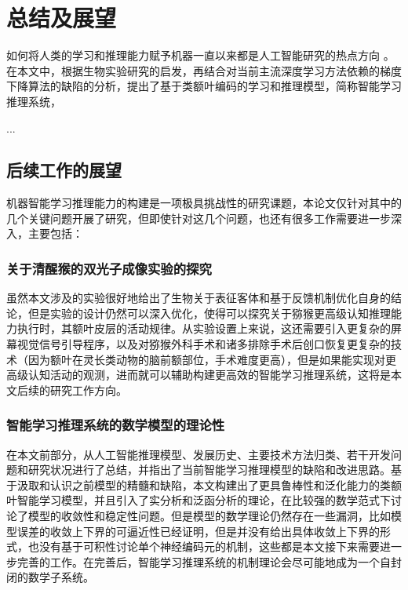 

\chapter{总结及展望}
\label{cha:intro}

如何将人类的学习和推理能力赋予机器一直以来都是人工智能研究的热点方向   。在本文中，根据生物实验研究的启发，再结合对当前主流深度学习方法依赖的梯度下降算法的缺陷的分析，提出了基于类额叶编码的学习和推理模型，简称智能学习推理系统，


...

\section{后续工作的展望}
机器智能学习推理能力的构建是一项极具挑战性的研究课题，本论文仅针对其中的几个关键问题开展了研究，但即使针对这几个问题，也还有很多工作需要进一步深入，主要包括： 

\subsection{关于清醒猴的双光子成像实验的探究}
虽然本文涉及的实验很好地给出了生物关于表征客体和基于反馈机制优化自身的结论，但是实验的设计仍然可以深入优化，使得可以探究关于猕猴更高级认知推理能力执行时，其额叶皮层的活动规律。从实验设置上来说，这还需要引入更复杂的屏幕视觉信号引导程序，以及对猕猴外科手术和诸多排除手术后创口恢复更复杂的技术（因为额叶在灵长类动物的脑前额部位，手术难度更高），但是如果能实现对更高级认知活动的观测，进而就可以辅助构建更高效的智能学习推理系统，这将是本文后续的研究工作方向。

\subsection{智能学习推理系统的数学模型的理论性}
在本文前部分，从人工智能推理模型、发展历史、主要技术方法归类、若干开发问题和研究状况进行了总结，并指出了当前智能学习推理模型的缺陷和改进思路。基于汲取和认识之前模型的精髓和缺陷，本文构建出了更具鲁棒性和泛化能力的类额叶智能学习模型，并且引入了实分析和泛函分析的理论，在比较强的数学范式下讨论了模型的收敛性和稳定性问题。但是模型的数学理论仍然存在一些漏洞，比如模型误差的收敛上下界的可逼近性已经证明，但是并没有给出具体收敛上下界的形式，也没有基于可积性讨论单个神经编码元的机制，这些都是本文接下来需要进一步完善的工作。在完善后，智能学习推理系统的机制理论会尽可能地成为一个自封闭的数学子系统。


